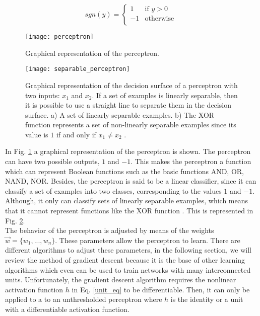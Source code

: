 \begin{equation}
	sgn(y)= \begin{cases}
	1 &\text{if $y>0$}\\
	-1 &\text{otherwise }\\
	\end{cases}	
\end{equation}

\begin{figure}
\centering
\texttt{[image: perceptron]}
\caption{Graphical representation of the perceptron.}
\label{fig:perceptron}
\end{figure}

\begin{figure}
\centering
\texttt{[image: separable\_perceptron]}
\caption[Graphical representation of the decision surface of a perceptron with two inputs.]{Graphical representation of the decision surface of a perceptron with two inputs: $x_{1}$ and $x_{2}$.  If a set of examples is linearly separable, then it is possible to use a straight line to separate them in the decision surface. a) A set of linearly separable examples. b) The XOR function represents a set of non-linearly separable examples since its value is $1$ if and only if $x_{1} \neq x_{2}$ \cite{machine_mitchell}.}
\label{fig:separable_perceptron}
\end{figure}

In Fig. \ref{fig:perceptron} a graphical representation of the perceptron is shown. The perceptron can have two possible outputs, $1$ and $-1$. This makes the perceptron a function which can represent Boolean functions such as the basic functions AND, OR, NAND, NOR. Besides, the perceptron is said to be a linear classifier, since it can classify a set of examples into two classes, corresponding to the values $1$ and $-1$. Although, it only can classify sets of linearly separable examples, which means that it cannot represent functions like the XOR function \cite{machine_mitchell}. This is represented in Fig. \ref{fig:separable_perceptron}.\\

The behavior of the perceptron is adjusted by means of the weights $\vec{w}= \{ w_{1},...,w_{n} \}$. These parameters allow the perceptron to learn. There are different algorithms to adjust these parameters, in the following section, we will review the method of gradient descent because it is the base of other learning algorithms which even can be used to train networks with many interconnected units. Unfortunately, the gradient descent algorithm requires the nonlinear activation function $h$ in Eq. \ref{unit_eq} to be differentiable. Then, it can only be applied to a to an unthresholded perceptron where $h$ is the identity or a unit with a differentiable activation function.\\

